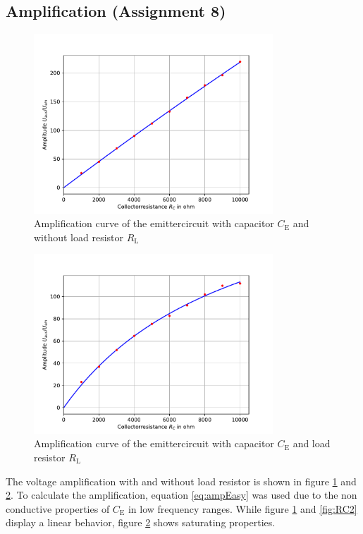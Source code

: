 \documentclass[11pt, a4paper]{article}
\begin{document}
\subsection{Amplification (Assignment 8)}
\begin{figure}[h]
    \centering
    \includegraphics[width=0.8\textwidth]{plots/RC1.pdf}
    \caption{Amplification curve of the emittercircuit with capacitor $C_{\text{E}}$ and without load resistor $R_{\text{L}}$}
    \label{fig:RC1}
\end{figure}

\begin{figure}[h]
    \centering
    \includegraphics[width=0.8\textwidth]{plots/RC3.pdf}
    \caption{Amplification curve of the emittercircuit with capacitor $C_{\text{E}}$ and load resistor $R_{\text{L}}$}
    \label{fig:RC3}
\end{figure}
The voltage amplification with and without load resistor is shown in figure \ref{fig:RC1} and \ref{fig:RC3}. To calculate the amplification, equation \ref{eq:ampEasy} was used due to the non conductive properties of $C_{\text{E}}$ in low frequency ranges.
While figure \ref{fig:RC1} and \ref{fig:RC2} display a linear behavior, figure \ref{fig:RC3} shows saturating properties.
\end{document}
